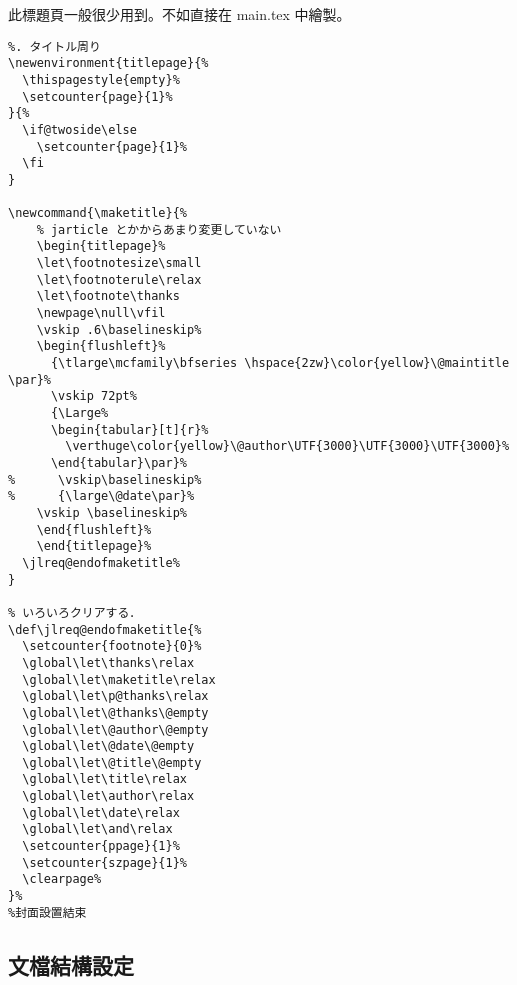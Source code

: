 \par 此標題頁一般很少用到。不如直接在 main.tex 中繪製。
\begin{lstlisting}[firstnumber=805]
%封面設置
%. タイトル周り
\newenvironment{titlepage}{%
  \thispagestyle{empty}%
  \setcounter{page}{1}%
}{%
  \if@twoside\else
    \setcounter{page}{1}%
  \fi
}

\newcommand{\maketitle}{%
    % jarticle とかからあまり変更していない
    \begin{titlepage}%
    \let\footnotesize\small
    \let\footnoterule\relax
    \let\footnote\thanks
    \newpage\null\vfil
    \vskip .6\baselineskip%
    \begin{flushleft}%
      {\tlarge\mcfamily\bfseries \hspace{2zw}\color{yellow}\@maintitle \par}%
      \vskip 72pt%
      {\Large%
      \begin{tabular}[t]{r}%
        \verthuge\color{yellow}\@author\UTF{3000}\UTF{3000}\UTF{3000}%
      \end{tabular}\par}%
%      \vskip\baselineskip%
%      {\large\@date\par}%
    \vskip \baselineskip%
    \end{flushleft}%
    \end{titlepage}%
  \jlreq@endofmaketitle%
}

% いろいろクリアする．
\def\jlreq@endofmaketitle{%
  \setcounter{footnote}{0}%
  \global\let\thanks\relax
  \global\let\maketitle\relax
  \global\let\p@thanks\relax
  \global\let\@thanks\@empty
  \global\let\@author\@empty
  \global\let\@date\@empty
  \global\let\@title\@empty
  \global\let\title\relax
  \global\let\author\relax
  \global\let\date\relax
  \global\let\and\relax
  \setcounter{ppage}{1}%
  \setcounter{szpage}{1}%
  \clearpage%
}%
%封面設置結束
\end{lstlisting}

%
\subsection{文檔結構設定}


